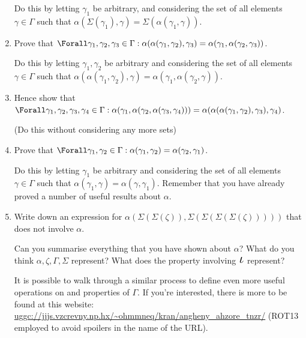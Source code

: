 \begin{enumerate}
  Do this by letting \(\gamma_1\) be arbitrary, and considering the set of all
  elements \(\gamma \in \Gamma\) such that
  \(\alpha(\Sigma(\gamma_1), \gamma) = \Sigma(\alpha(\gamma_1, \gamma))\).
 \item
  Prove that
  \(\Forall \gamma_1, \gamma_2, \gamma_3 \in \Gamma :
    \alpha(\alpha(\gamma_1, \gamma_2), \gamma_3) =
    \alpha(\gamma_1, \alpha(\gamma_2, \gamma_3))\).

  Do this by letting \(\gamma_1, \gamma_2\) be arbitrary and considering the set
  of all elements \(\gamma \in \Gamma\) such that
  \(\alpha(\alpha(\gamma_1, \gamma_2), \gamma)
  = \alpha(\gamma_1, \alpha(\gamma_2, \gamma))\).
 \item
  Hence show that
  \(\Forall \gamma_1, \gamma_2, \gamma_3, \gamma_4 \in \Gamma :
    \alpha(\gamma_1, \alpha(\gamma_2, \alpha(\gamma_3, \gamma_4))) =
    \alpha(\alpha(\alpha(\gamma_1, \gamma_2), \gamma_3), \gamma_4)\).

  (Do this without considering any more sets)
 \item
  Prove that
  \(\Forall \gamma_1, \gamma_2 \in \Gamma :
    \alpha(\gamma_1, \gamma_2) = \alpha(\gamma_2, \gamma_1)\).

  Do this by letting \(\gamma_1\) be arbitrary and considering the set of all
  elements \(\gamma \in \Gamma\) such that
  \(\alpha(\gamma_1, \gamma) = \alpha(\gamma, \gamma_1)\). Remember that you
  have already proved a number of useful results about \(\alpha\).
 \item
  Write down an expression for
  \(\alpha(\Sigma(\Sigma(\zeta)), \Sigma(\Sigma(\Sigma(\Sigma(\zeta)))))\) that
  does not involve \(\alpha\).

  Can you summarise everything that you have shown about \(\alpha\)? What do
  you think \(\alpha, \zeta, \Gamma, \Sigma\) represent? What does the property
  involving \(\BigIota\) represent?

  It is possible to walk through a similar process to define even more useful
  operations on and properties of \(\Gamma\). If you're interested, there is
  more to be found at this website:\\
  \url{uggc://jjjs.vzcrevny.np.hx/~ohmmneq/kran/angheny_ahzore_tnzr/} (ROT13
  employed to avoid spoilers in the name of the URL).
\end{enumerate}
